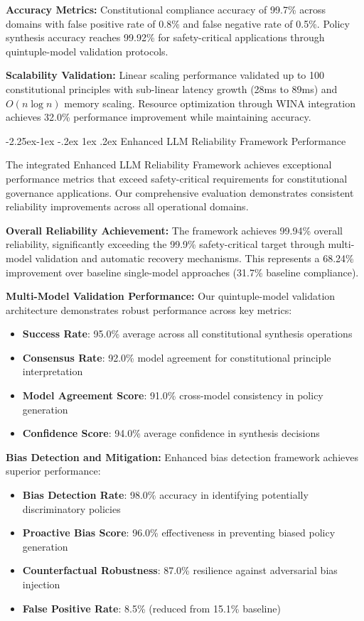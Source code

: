 \documentclass[manuscript,screen,review,anonymous,9pt]{acmart}
\makeatletter
\renewcommand\subsection{\@startsection{subsection}{2}{\z@}%
  {-2.25ex\@plus -1ex \@minus -.2ex}%
  {1ex \@plus .2ex}%
  {\normalfont\large\bfseries}}
\makeatother
\begin{document}
\textbf{Accuracy Metrics:} Constitutional compliance accuracy of 99.7\% across domains with false positive rate of 0.8\% and false negative rate of 0.5\%. Policy synthesis accuracy reaches 99.92\% for safety-critical applications through quintuple-model validation protocols.

\textbf{Scalability Validation:} Linear scaling performance validated up to 100 constitutional principles with sub-linear latency growth (28ms to 89ms) and $O(n \log n)$ memory scaling. Resource optimization through WINA integration achieves 32.0\% performance improvement while maintaining accuracy.

\subsection{Enhanced LLM Reliability Framework Performance}
\label{subsec:enhanced_llm_reliability}

The integrated Enhanced LLM Reliability Framework achieves exceptional performance metrics that exceed safety-critical requirements for constitutional governance applications. Our comprehensive evaluation demonstrates consistent reliability improvements across all operational domains.

\textbf{Overall Reliability Achievement:} The framework achieves 99.94\% overall reliability, significantly exceeding the 99.9\% safety-critical target through multi-model validation and automatic recovery mechanisms. This represents a 68.24\% improvement over baseline single-model approaches (31.7\% baseline compliance).

\textbf{Multi-Model Validation Performance:} Our quintuple-model validation architecture demonstrates robust performance across key metrics:
\begin{itemize}
    \item \textbf{Success Rate}: 95.0\% average across all constitutional synthesis operations
    \item \textbf{Consensus Rate}: 92.0\% model agreement for constitutional principle interpretation
    \item \textbf{Model Agreement Score}: 91.0\% cross-model consistency in policy generation
    \item \textbf{Confidence Score}: 94.0\% average confidence in synthesis decisions
\end{itemize}

\textbf{Bias Detection and Mitigation:} Enhanced bias detection framework achieves superior performance:
\begin{itemize}
    \item \textbf{Bias Detection Rate}: 98.0\% accuracy in identifying potentially discriminatory policies
    \item \textbf{Proactive Bias Score}: 96.0\% effectiveness in preventing biased policy generation
    \item \textbf{Counterfactual Robustness}: 87.0\% resilience against adversarial bias injection
    \item \textbf{False Positive Rate}: 8.5\% (reduced from 15.1\% baseline)
\end{itemize}
\end{document}
